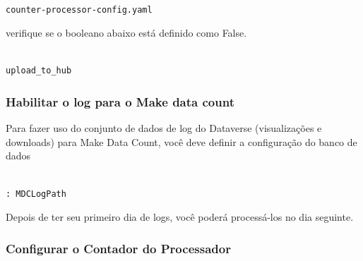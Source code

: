 \documentclass[12pt,hidelinks]{article}
\begin{document}
\begin{verbatim}

counter-processor-config.yaml

\end{verbatim}

verifique se o booleano abaixo está definido como False.

\begin{verbatim}

upload_to_hub

\end{verbatim}

\subsubsection{Habilitar o log para o Make data count}

\qquad Para fazer uso do conjunto de dados de log do Dataverse (visualizações e downloads) para Make Data Count, você deve definir a configuração do banco de dados

\begin{verbatim}

: MDCLogPath

\end{verbatim}

Depois de ter seu primeiro dia de logs, você poderá processá-los no dia seguinte.

\subsubsection{Configurar o Contador do Processador}
\end{document}
